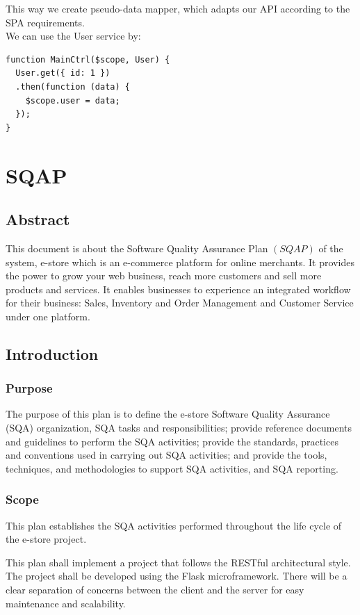 \documentclass{report}
\begin{document}
This way we create pseudo-data mapper, which adapts our API according to the SPA requirements. \\
We can use the User service by:
\begin{lstlisting}
function MainCtrl($scope, User) {
  User.get({ id: 1 })
  .then(function (data) {
    $scope.user = data;
  });
}
\end{lstlisting}

\chapter{SQAP} %
\section{Abstract}
This document is about the Software Quality Assurance Plan $(SQAP)$ of the system, e-store which is an e-commerce platform for online merchants. It provides the power to grow your web business, reach more customers and sell more products and services. It enables businesses to experience an integrated workflow for their business: Sales, Inventory and Order Management and Customer Service under one platform.
\section{Introduction}
\subsection{Purpose}
The purpose of this plan is to define the e-store Software Quality Assurance (SQA) organization, SQA tasks and responsibilities; provide reference documents and guidelines to perform the SQA activities; provide the standards, practices and conventions used in carrying out SQA activities; and provide the tools, techniques, and methodologies to support SQA activities, and SQA reporting.
	
\subsection{Scope}
This plan establishes the SQA activities performed throughout the life cycle of the e-store project.

This plan shall implement a project that follows the RESTful architectural style. The project shall be developed using the Flask microframework. There will be a clear separation of concerns between the client and the server for easy maintenance and scalability.
\end{document}

